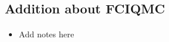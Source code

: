 \documentclass[%
oneside,                 %
final,                   %
10pt]{article}
\begin{document}
\noindent



\subsection*{Addition about FCIQMC}

\paragraph{}
\begin{itemize}
\item Add notes here
\end{itemize}

\noindent






\end{document}
